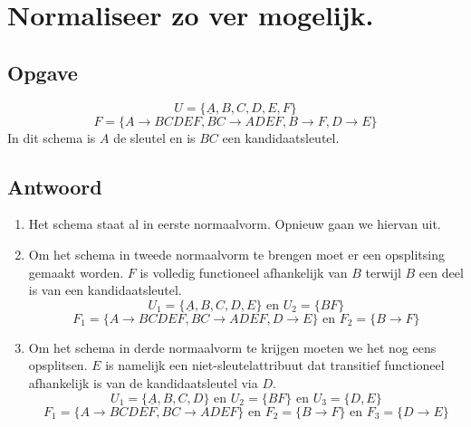 \documentclass[normaalvormen.tex]{subfiles}
\begin{document}
\section{Normaliseer zo ver mogelijk.}
\subsection*{Opgave}
\[
U = \{\underline{A},B,C,D,E,F\}
\]
\[
F = \{A\rightarrow BCDEF , BC\rightarrow ADEF, B\rightarrow F, D\rightarrow E\}
\]
In dit schema is $A$ de sleutel en is $BC$ een kandidaatsleutel.

\subsection*{Antwoord}
\begin{enumerate}
\item Het schema staat al in eerste normaalvorm. Opnieuw gaan we hiervan uit.

\item Om het schema in tweede normaalvorm te brengen moet er een opsplitsing gemaakt worden. $F$ is volledig functioneel afhankelijk van $B$ terwijl $B$ een deel is van een kandidaatsleutel.
\[
U_{1} = \{\underline{A},B,C,D,E\}\text{ en } U_{2} = \{BF\}
\]
\[
F_{1} = \{A\rightarrow BCDEF , BC\rightarrow ADEF, D\rightarrow E\} \text{ en } F_{2} = \{B\rightarrow F\}
\]
\item Om het schema in derde normaalvorm te krijgen moeten we het nog eens opsplitsen. $E$ is namelijk een niet-sleutelattribuut dat transitief functioneel afhankelijk is van de kandidaatsleutel via $D$.
\[
U_{1} = \{\underline{A},B,C,D\}\text{ en } U_{2} = \{BF\} \text{ en } U_3 = \{D,E\}
\]
\[
F_{1} = \{A\rightarrow BCDEF , BC\rightarrow ADEF\} \text{ en } F_{2} = \{B\rightarrow F\} \text{ en } F_{3} = \{D\rightarrow E\}
\]
\end{enumerate}
\end{document}
